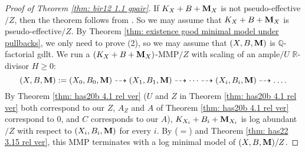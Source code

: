 \documentclass[11pt]{amsart}
\numberwithin{equation}{section}
\newcommand{\Mm}{{\bf{M}}}
\newcommand{\Qq}{\mathbb{Q}}
\newcommand{\Rr}{\mathbb{R}}
\theoremstyle{definition}
\theoremstyle{definition}
\theoremstyle{definition}
\begin{document}
\begin{proof}[Proof of Theorem \ref{thm: bir12 1.1 gpair}]
If $K_X+B+\Mm_X$ is not pseudo-effective$/Z$, then the theorem follows from \cite[Lemma 4.4(1)]{BZ16}. So we may assume that $K_X+B+\Mm_X$ is pseudo-effective$/Z$. By Theorem \ref{thm: existence good minimal model under pullbacks}, we only need to prove (2), so we may assume that $(X,B,\Mm)$ is $\Qq$-factorial gdlt. We run a $(K_X+B+\Mm_X)$-MMP$/Z$ with scaling of an ample$/U$ $\Rr$-divisor $H\geq 0$:
$$(X,B,\Mm):=(X_0,B_0,\Mm)\dashrightarrow (X_1,B_1,\Mm)\dashrightarrow\dots\dashrightarrow (X_i,B_i,\Mm)\dashrightarrow\dots.$$
By Theorem \ref{thm: has20b 4.1 rel ver} ($U$ and $Z$ in Theorem \ref{thm: has20b 4.1 rel ver} both correspond to our $Z$, $A_Z$ and $A$ of Theorem \ref{thm: has20b 4.1 rel ver} correspond to $0$, and $C$ corresponds to our $A$), 
$K_{X_i}+B_i+\Mm_{X_i}$ is log abundant$/Z$ with respect to $(X_i,B_i,\Mm)$ for every $i$. By \cite[Theorem 2.8]{HL21} ($=$\cite[Version 3, Theorem 2.24]{HL21}) and Theorem \ref{thm: has22 3.15 rel ver}, this MMP terminates with a log minimal model of $(X,B,\Mm)/Z$.
\end{proof}
\end{document}
